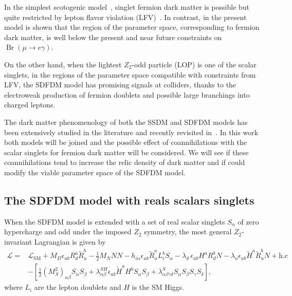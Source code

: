 In the simplest scotogenic model~\cite{Ma:2006km}, singlet fermion
dark matter is possible but quite restricted by lepton flavor
violation (LFV)~\cite{Toma:2013zsa,Vicente:2014wga}. 
In contrast, in the present model is shown that the region of the
parameter space, corresponding to fermion dark matter, is well below
the present and near future constraints on $\operatorname{Br}(\mu\to
e\gamma)$.

On the other hand, when the lightest $Z_2$-odd particle (LOP) is one
of the scalar singlets, in the regions of the parameter space 
compatible with constraints from LFV, the SDFDM model has promising signals at colliders,
thanks to the electroweak production of fermion doublets and possible
large branchings into charged leptons.

The dark matter phenomenology of both the SSDM and SDFDM models has
been extensively studied in the literature and recently
revisited in~\cite{Abe:2014gua}.
In this work both models will be joined and the possible effect of coannihilations with the
scalar singlets for fermion dark matter will be considered. 
We will see if these coannihilations tend to increase the relic
density of dark matter and if could modify the viable parameter space of
the SDFDM model. 








\subsection{The SDFDM model with reals scalars singlets}
\label{sec:model-with-scalars}
%
When the SDFDM model is extended with a set of 
real scalar singlets  $S_{\alpha}$ of zero hypercharge
and odd under the imposed $Z_2$ symmetry,
the most general $Z_2$-invariant Lagrangian is given by
\begin{align}
\label{eq:lt13a}
 \mathcal{L}= &\mathcal{L}_{\text{SM}}+ M_D \epsilon_{ab}R^a_d \widetilde{R}^b_u-\tfrac{1}{2}M_N NN-h_{i\alpha} \epsilon_{ab}\widetilde{R}_u^a L_{i}^b S_{\alpha}-\lambda_d\, \epsilon_{ab}H^a R_d^b N-\lambda_u \epsilon_{ab}\widetilde{H}^a \widetilde{R}_u^b N+\text{h.c}\nonumber\\
&-\left[ 
\tfrac{1}{2}\left({M}_S^2\right)_{\alpha\beta} S_{\alpha}S_\beta
   +\lambda^{SH}_{\alpha\beta} \epsilon_{ab}\widetilde{H}^{a}H^bS_{\alpha}S_{\beta}+\lambda^{S}_{\alpha\beta\gamma\delta}S_{\alpha}S_{\beta}S_{\gamma}S_{\delta} 
\right], 
\end{align}
where $L_{i}$ are the lepton doublets and $H$ is the SM Higgs.

